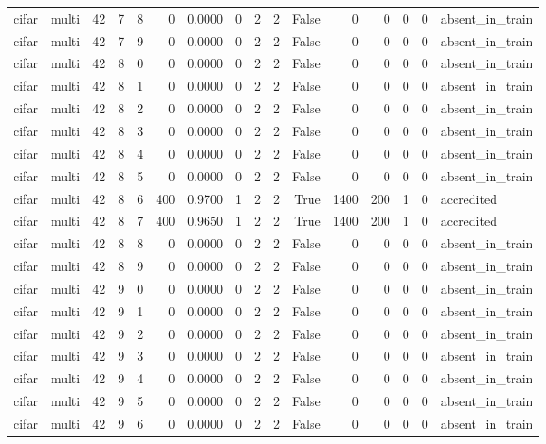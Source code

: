 \begin{tabular}{llrrrrrrrrrrrrrl}
cifar & multi & 42 & 7 & 8 & 0 & 0.0000 & 0 & 2 & 2 & False & 0 & 0 & 0 & 0 & absent\_in\_train \\
cifar & multi & 42 & 7 & 9 & 0 & 0.0000 & 0 & 2 & 2 & False & 0 & 0 & 0 & 0 & absent\_in\_train \\
cifar & multi & 42 & 8 & 0 & 0 & 0.0000 & 0 & 2 & 2 & False & 0 & 0 & 0 & 0 & absent\_in\_train \\
cifar & multi & 42 & 8 & 1 & 0 & 0.0000 & 0 & 2 & 2 & False & 0 & 0 & 0 & 0 & absent\_in\_train \\
cifar & multi & 42 & 8 & 2 & 0 & 0.0000 & 0 & 2 & 2 & False & 0 & 0 & 0 & 0 & absent\_in\_train \\
cifar & multi & 42 & 8 & 3 & 0 & 0.0000 & 0 & 2 & 2 & False & 0 & 0 & 0 & 0 & absent\_in\_train \\
cifar & multi & 42 & 8 & 4 & 0 & 0.0000 & 0 & 2 & 2 & False & 0 & 0 & 0 & 0 & absent\_in\_train \\
cifar & multi & 42 & 8 & 5 & 0 & 0.0000 & 0 & 2 & 2 & False & 0 & 0 & 0 & 0 & absent\_in\_train \\
cifar & multi & 42 & 8 & 6 & 400 & 0.9700 & 1 & 2 & 2 & True & 1400 & 200 & 1 & 0 & accredited \\
cifar & multi & 42 & 8 & 7 & 400 & 0.9650 & 1 & 2 & 2 & True & 1400 & 200 & 1 & 0 & accredited \\
cifar & multi & 42 & 8 & 8 & 0 & 0.0000 & 0 & 2 & 2 & False & 0 & 0 & 0 & 0 & absent\_in\_train \\
cifar & multi & 42 & 8 & 9 & 0 & 0.0000 & 0 & 2 & 2 & False & 0 & 0 & 0 & 0 & absent\_in\_train \\
cifar & multi & 42 & 9 & 0 & 0 & 0.0000 & 0 & 2 & 2 & False & 0 & 0 & 0 & 0 & absent\_in\_train \\
cifar & multi & 42 & 9 & 1 & 0 & 0.0000 & 0 & 2 & 2 & False & 0 & 0 & 0 & 0 & absent\_in\_train \\
cifar & multi & 42 & 9 & 2 & 0 & 0.0000 & 0 & 2 & 2 & False & 0 & 0 & 0 & 0 & absent\_in\_train \\
cifar & multi & 42 & 9 & 3 & 0 & 0.0000 & 0 & 2 & 2 & False & 0 & 0 & 0 & 0 & absent\_in\_train \\
cifar & multi & 42 & 9 & 4 & 0 & 0.0000 & 0 & 2 & 2 & False & 0 & 0 & 0 & 0 & absent\_in\_train \\
cifar & multi & 42 & 9 & 5 & 0 & 0.0000 & 0 & 2 & 2 & False & 0 & 0 & 0 & 0 & absent\_in\_train \\
cifar & multi & 42 & 9 & 6 & 0 & 0.0000 & 0 & 2 & 2 & False & 0 & 0 & 0 & 0 & absent\_in\_train \\

\end{tabular}

